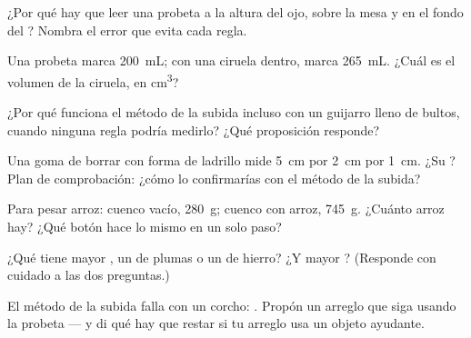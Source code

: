 \begin{exercise}[$\star$]\label{exo:g6:mass-and-volume:3}
¿Por qué hay que leer una probeta a la altura del ojo, sobre la mesa y
en el fondo del ? Nombra el error que evita cada regla.
\end{exercise}

\begin{exercise}[$\star$]\label{exo:g6:mass-and-volume:4}
Una probeta marca \qty{200}{mL}; con una ciruela dentro, marca
\qty{265}{mL}. ¿Cuál es el volumen de la ciruela, en \unit{cm^3}?
\end{exercise}

\begin{exercise}[$\star$]\label{exo:g6:mass-and-volume:5}
¿Por qué funciona el método de la subida incluso con un guijarro lleno
de bultos, cuando ninguna regla podría medirlo? ¿Qué proposición
responde?
\end{exercise}

\begin{exercise}[$\star$]\label{exo:g6:mass-and-volume:6}
Una goma de borrar con forma de ladrillo mide \qty{5}{cm} por
\qty{2}{cm} por \qty{1}{cm}. ¿Su ? Plan de comprobación:
¿cómo lo confirmarías con el método de la subida?
\end{exercise}

\begin{exercise}[$\star$]\label{exo:g6:mass-and-volume:7}
Para pesar arroz: cuenco vacío, \qty{280}{g}; cuenco con arroz,
\qty{745}{g}. ¿Cuánto arroz hay? ¿Qué botón hace lo mismo en un solo
paso?
\end{exercise}

\begin{exercise}[$\star$]\label{exo:g6:mass-and-volume:8}
¿Qué tiene mayor , un  de plumas o un  de
hierro? ¿Y mayor ? (Responde con cuidado a las dos preguntas.)
\end{exercise}

\begin{exercise}[$\star\star$]\label{exo:g6:mass-and-volume:9}
El método de la subida falla con un corcho: . Propón un arreglo
que siga usando la probeta --- y di qué hay que restar si tu arreglo
usa un objeto ayudante.
\end{exercise}

